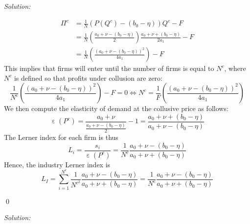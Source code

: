 \documentclass[12pt]{article}
\DeclareMathOperator{\eps}{\varepsilon}
\newenvironment{problem}[2][Problem]{\begin{trivlist}
\item[\hskip \labelsep {\bfseries #1}\hskip \labelsep {\bfseries #2.}]}{\end{trivlist}}
\newenvironment{sol}
    {\emph{Solution:}
    }
    {
    \qed
    }
\begin{document}
\begin{sol}
\begin{enumerate}[label=\alph*) ]
     \begin{align*}\Pi^c &= \frac{1}{N} \left( P(Q^c) - (b_0 - \eta)\right)Q^c - F\\
        &= \frac{1}{N} \left(\frac{a_0 + \nu - (b_0 - \eta)}{2} \right)\frac{a_0 + \nu + (b_0 - \eta)}{2 a_1} - F\\
        &= \frac{1}{N}\left( \frac{(a_0 + \nu - (b_0 - \eta))^2}{4 a_1}\right) - F
    \end{align*}
    This implies that firms will enter until the number of firms is equal to $N^c$, where $N^c$ is defined so that profits under collusion are zero:
\[\frac{1}{N^c}\left( \frac{(a_0 + \nu - (b_0 - \eta))^2}{4 a_1}\right) - F = 0 \iff N^c = \frac{1}{F}\left( \frac{(a_0 + \nu - (b_0 - \eta))^2}{4 a_1}\right)\]
We then compute the elasticity of demand at the collusive price as follows:
\[\eps(P^c) = \frac{a_0 + \nu}{\frac{a_0 + \nu - (b_0 - \eta)}{2}} - 1 = \frac{a_0 + \nu + (b_0 - \eta)}{a_0 + \nu - (b_0 - \eta)}\]
The Lerner index for each firm is thus
\[L_i = \frac{s_i}{\eps(P^c)} = \frac{1}{N^c} \frac{a_0 + \nu - (b_0 - \eta)}{a_0 + \nu + (b_0 - \eta)}\]
Hence, the industry Lerner index is
\[L_I = \sum_{i=1}^{N^c} \frac{1}{N^c^2 }\frac{a_0 + \nu - (b_0 - \eta)}{a_0 + \nu + (b_0 - \eta)} = \frac{1}{N^c}\frac{a_0 + \nu - (b_0 - \eta)}{a_0 + \nu + (b_0 - \eta)} \]
\end{enumerate}
\end{sol}
\begin{problem}{2}
\end{problem}
\begin{sol}
    
\end{document}
